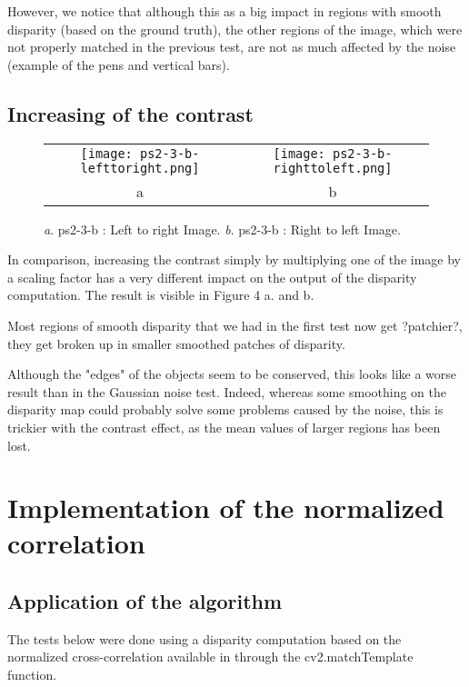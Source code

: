 \documentclass[a4paper,11pt]{article}
\begin{document}
However, we notice that although this as a big impact in regions with smooth disparity (based on the ground truth), the other regions of the image, which were not properly matched in the previous test, are not as much affected by the noise (example of the pens and vertical bars).


\subsection{Increasing of the contrast}



 \begin{figure}[H]
\begin{center}
\begin{tabular}{cc}
	\texttt{[image: ps2-3-b-lefttoright.png]}&
	\texttt{[image: ps2-3-b-righttoleft.png]}\\
	a&b
\end{tabular}
\end{center}
\caption{ 
\textit{a}. ps2-3-b : Left to right Image.  \textit{b}. ps2-3-b : Right to left Image. }
\label{ps2-1}
\end{figure}


In comparison, increasing the contrast simply by multiplying one of the image by a scaling factor has a very different impact on the output of the disparity computation. The result is visible in Figure 4 a. and b. 

Most regions of smooth disparity that we had in the first test now get ?patchier?, they get broken up in smaller smoothed patches of disparity.

Although the "edges" of the objects seem to be conserved, this looks like a worse result than in the Gaussian noise test.
Indeed, whereas some smoothing on the disparity map could probably solve some problems caused by the noise, this is trickier with the contrast effect, as the mean values of larger regions has been lost.

\section{Implementation of the normalized correlation}

\subsection{Application of the algorithm}

The tests below were done using a disparity computation based on the normalized cross-correlation available in through the cv2.matchTemplate function.
\end{document}
